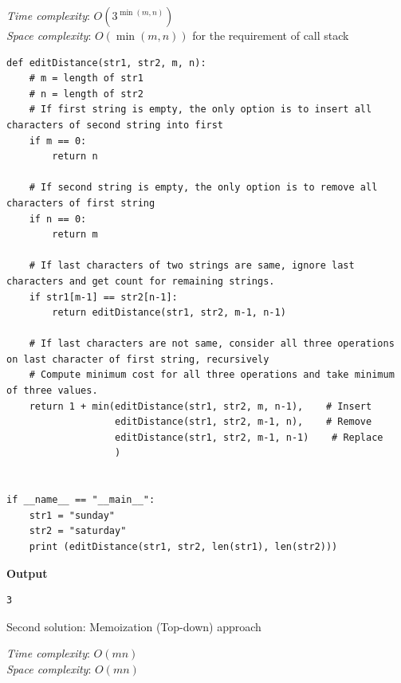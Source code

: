 \documentclass[a4paper,11pt]{book}
\begin{document}
\noindent \textit{Time complexity}: $O(3^{\min(m,n)})$\\
\noindent \textit{Space complexity}: $O(\min(m,n))$ for the requirement of call stack


\begin{lstlisting}
def editDistance(str1, str2, m, n):
    # m = length of str1
    # n = length of str2
    # If first string is empty, the only option is to insert all characters of second string into first
    if m == 0:
        return n
 
    # If second string is empty, the only option is to remove all characters of first string
    if n == 0:
        return m
    
    # If last characters of two strings are same, ignore last characters and get count for remaining strings.
    if str1[m-1] == str2[n-1]:
        return editDistance(str1, str2, m-1, n-1)
 
    # If last characters are not same, consider all three operations on last character of first string, recursively
    # Compute minimum cost for all three operations and take minimum of three values.
    return 1 + min(editDistance(str1, str2, m, n-1),    # Insert
                   editDistance(str1, str2, m-1, n),    # Remove
                   editDistance(str1, str2, m-1, n-1)    # Replace
                   )
 
 
if __name__ == "__main__":
    str1 = "sunday"
    str2 = "saturday"
    print (editDistance(str1, str2, len(str1), len(str2)))
\end{lstlisting}
\textbf{Output}
\begin{lstlisting}
3
\end{lstlisting}

\noindent Second solution: Memoization (Top-down) approach 

\noindent \textit{Time complexity}: $O(mn)$\\
\noindent \textit{Space complexity}: $O(mn)$ 
\end{document}
